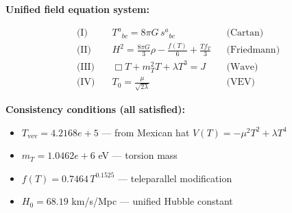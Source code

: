 
\textbf{Unified field equation system:}

\begin{align}
  \text{(I)} \quad & T^a{}_{bc} = 8\pi G \, s^a{}_{bc} && \text{(Cartan)} \\
  \text{(II)} \quad & H^2 = \frac{8\pi G}{3}\rho - \frac{f(T)}{6} + \frac{Tf_T}{3} && \text{(Friedmann)} \\
  \text{(III)} \quad & \Box T + m_T^2 T + \lambda T^3 = J && \text{(Wave)} \\
  \text{(IV)} \quad & T_0 = \frac{\mu}{\sqrt{2\lambda}} && \text{(VEV)}
\end{align}

\textbf{Consistency conditions (all satisfied):}
\begin{itemize}
  \item $T_{\text{vev}} = 4.2168e+5$ — from Mexican hat $V(T) = -\mu^2 T^2 + \lambda T^4$
  \item $m_T = 1.0462e+6$ eV — torsion mass
  \item $f(T) = 0.7464 \, T^{0.1525}$ — teleparallel modification
  \item $H_0 = 68.19$ km/s/Mpc — unified Hubble constant
\end{itemize}